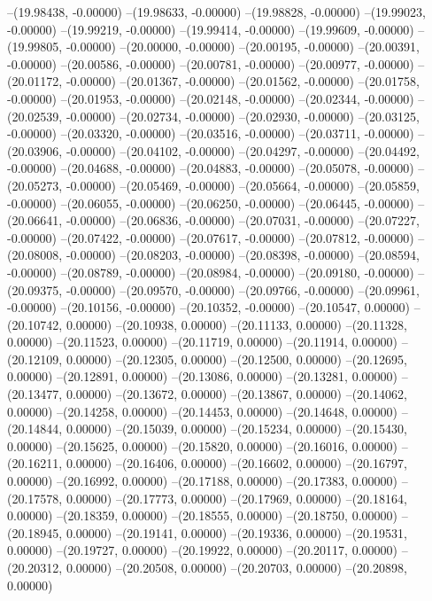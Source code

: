 --(19.98438, -0.00000)
--(19.98633, -0.00000)
--(19.98828, -0.00000)
--(19.99023, -0.00000)
--(19.99219, -0.00000)
--(19.99414, -0.00000)
--(19.99609, -0.00000)
--(19.99805, -0.00000)
--(20.00000, -0.00000)
--(20.00195, -0.00000)
--(20.00391, -0.00000)
--(20.00586, -0.00000)
--(20.00781, -0.00000)
--(20.00977, -0.00000)
--(20.01172, -0.00000)
--(20.01367, -0.00000)
--(20.01562, -0.00000)
--(20.01758, -0.00000)
--(20.01953, -0.00000)
--(20.02148, -0.00000)
--(20.02344, -0.00000)
--(20.02539, -0.00000)
--(20.02734, -0.00000)
--(20.02930, -0.00000)
--(20.03125, -0.00000)
--(20.03320, -0.00000)
--(20.03516, -0.00000)
--(20.03711, -0.00000)
--(20.03906, -0.00000)
--(20.04102, -0.00000)
--(20.04297, -0.00000)
--(20.04492, -0.00000)
--(20.04688, -0.00000)
--(20.04883, -0.00000)
--(20.05078, -0.00000)
--(20.05273, -0.00000)
--(20.05469, -0.00000)
--(20.05664, -0.00000)
--(20.05859, -0.00000)
--(20.06055, -0.00000)
--(20.06250, -0.00000)
--(20.06445, -0.00000)
--(20.06641, -0.00000)
--(20.06836, -0.00000)
--(20.07031, -0.00000)
--(20.07227, -0.00000)
--(20.07422, -0.00000)
--(20.07617, -0.00000)
--(20.07812, -0.00000)
--(20.08008, -0.00000)
--(20.08203, -0.00000)
--(20.08398, -0.00000)
--(20.08594, -0.00000)
--(20.08789, -0.00000)
--(20.08984, -0.00000)
--(20.09180, -0.00000)
--(20.09375, -0.00000)
--(20.09570, -0.00000)
--(20.09766, -0.00000)
--(20.09961, -0.00000)
--(20.10156, -0.00000)
--(20.10352, -0.00000)
--(20.10547, 0.00000)
--(20.10742, 0.00000)
--(20.10938, 0.00000)
--(20.11133, 0.00000)
--(20.11328, 0.00000)
--(20.11523, 0.00000)
--(20.11719, 0.00000)
--(20.11914, 0.00000)
--(20.12109, 0.00000)
--(20.12305, 0.00000)
--(20.12500, 0.00000)
--(20.12695, 0.00000)
--(20.12891, 0.00000)
--(20.13086, 0.00000)
--(20.13281, 0.00000)
--(20.13477, 0.00000)
--(20.13672, 0.00000)
--(20.13867, 0.00000)
--(20.14062, 0.00000)
--(20.14258, 0.00000)
--(20.14453, 0.00000)
--(20.14648, 0.00000)
--(20.14844, 0.00000)
--(20.15039, 0.00000)
--(20.15234, 0.00000)
--(20.15430, 0.00000)
--(20.15625, 0.00000)
--(20.15820, 0.00000)
--(20.16016, 0.00000)
--(20.16211, 0.00000)
--(20.16406, 0.00000)
--(20.16602, 0.00000)
--(20.16797, 0.00000)
--(20.16992, 0.00000)
--(20.17188, 0.00000)
--(20.17383, 0.00000)
--(20.17578, 0.00000)
--(20.17773, 0.00000)
--(20.17969, 0.00000)
--(20.18164, 0.00000)
--(20.18359, 0.00000)
--(20.18555, 0.00000)
--(20.18750, 0.00000)
--(20.18945, 0.00000)
--(20.19141, 0.00000)
--(20.19336, 0.00000)
--(20.19531, 0.00000)
--(20.19727, 0.00000)
--(20.19922, 0.00000)
--(20.20117, 0.00000)
--(20.20312, 0.00000)
--(20.20508, 0.00000)
--(20.20703, 0.00000)
--(20.20898, 0.00000)
